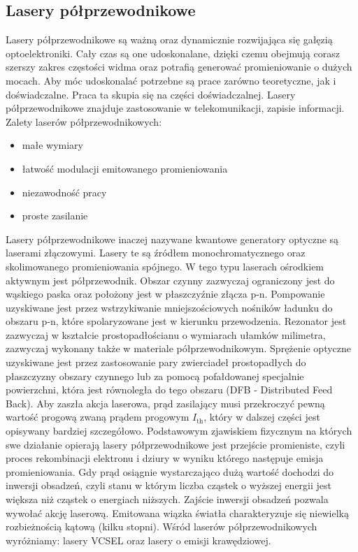 \subsection{Lasery półprzewodnikowe}
Lasery półprzewodnikowe są ważną oraz dynamicznie rozwijająca się gałęzią optoelektroniki. Cały czas są one udoskonalane, dzięki czemu obejmują corasz szerszy zakres częstości widma oraz potrafią generować promieniowanie o dużych mocach.
Aby móc udoskonalać potrzebne są prace zarówno teoretyczne, jak i doświadczalne. Praca ta skupia się na części doświadczalnej.
Lasery półprzewodnikowe znajduje zastosowanie w telekomunikacji, zapisie informacji.
Zalety laserów półprzewodnikowych:
\begin{itemize}
\item małe wymiary
\item łatwość modulacji emitowanego promieniowania
\item niezawodność pracy
\item proste zasilanie
\end{itemize}
 \newpage
Lasery półprzewodnikowe inaczej nazywane kwantowe generatory optyczne są laserami złączowymi. Lasery te są źródłem
monochromatycznego oraz skolimowanego promieniowania spójnego. W tego typu laserach ośrodkiem aktywnym jest półprzewodnik.
Obszar czynny zazwyczaj ograniczony jest do wąskiego paska oraz położony jest w płaszczyźnie złącza p-n.
Pompowanie uzyskiwane jest przez wstrzykiwanie mniejszościowych nośników ładunku do obszaru p-n, które spolaryzowane jest w kierunku przewodzenia.
Rezonator jest zazwyczaj w kształcie prostopadłościanu o wymiarach ułamków milimetra, zazwyczaj wykonany także w materiale półprzewodnikowym\cite{publikcja_nakwaski}.
Sprężenie optyczne uzyskiwane jest przez zastosowanie pary zwierciadeł prostopadłych do płaszczyzny obszary czynnego lub
za pomocą pofałdowanej specjalnie powierzchni, która jest równoległa do tego obszaru (DFB - Distributed Feed Back).
Aby zaszła akcja laserowa, prąd zasilający musi przekroczyć pewną wartość progową zwaną prądem progowym $I_{\mathrm{th}}$, który w dalszej części jest
opisywany bardziej szczegółowo.
Podstawowym zjawiskiem fizycznym na których swe działanie opierają lasery półprzewodnikowe jest przejście promieniste, czyli proces rekombinacji elektronu i dziury w wyniku którego następuje emisja promieniowania. Gdy prąd osiągnie wystarczająco
dużą wartość dochodzi do inwersji obsadzeń, czyli stanu w którym liczba cząstek o wyższej energii jest większa niż cząstek o energiach niższych.
Zajście inwersji obsadzeń pozwala wywołać akcję laserową. Emitowana wiązka światła charakteryzuje się niewielką rozbieżnością kątową (kilku stopni). Wśród laserów półprzewodnikowych
wyróżniamy: lasery VCSEL oraz lasery o emisji krawędziowej.
